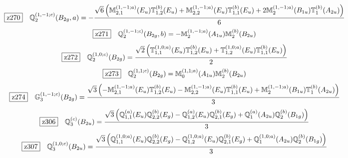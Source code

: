 \documentclass[fleqn,10pt,landscape]{jsarticle}
\begin{document}
\begin{dmath*}
\hspace*{3mm}\fbox{z270}\quad \mathbb{Q}_{2}^{(1,-1;c)}(B_{2g},a)=- \frac{\sqrt{6} \left(\mathbb{M}_{2,1}^{(1,-1;a)}(E_{u}) \mathbb{T}_{1,2}^{(b)}(E_{u}) + \mathbb{M}_{2,2}^{(1,-1;a)}(E_{u}) \mathbb{T}_{1,1}^{(b)}(E_{u}) + 2 \mathbb{M}_{2}^{(1,-1;a)}(B_{1u}) \mathbb{T}_{1}^{(b)}(A_{2u})\right)}{6}
\end{dmath*}
\begin{dmath*}
\hspace*{3mm}\fbox{z271}\quad \mathbb{Q}_{2}^{(1,-1;c)}(B_{2g},b)=- \mathbb{M}_{2}^{(1,-1;a)}(A_{1u}) \mathbb{M}_{2}^{(b)}(B_{2u})
\end{dmath*}
\begin{dmath*}
\hspace*{3mm}\fbox{z272}\quad \mathbb{Q}_{2}^{(1,0;c)}(B_{2g})=\frac{\sqrt{2} \left(\mathbb{T}_{1,1}^{(1,0;a)}(E_{u}) \mathbb{T}_{1,2}^{(b)}(E_{u}) + \mathbb{T}_{1,2}^{(1,0;a)}(E_{u}) \mathbb{T}_{1,1}^{(b)}(E_{u})\right)}{2}
\end{dmath*}
\begin{dmath*}
\hspace*{3mm}\fbox{z273}\quad \mathbb{Q}_{2}^{(1,1;c)}(B_{2g})=\mathbb{M}_{0}^{(1,1;a)}(A_{1u}) \mathbb{M}_{2}^{(b)}(B_{2u})
\end{dmath*}
\begin{dmath*}
\hspace*{3mm}\fbox{z274}\quad \mathbb{G}_{3}^{(1,-1;c)}(B_{2g})=\frac{\sqrt{3} \left(- \mathbb{M}_{2,1}^{(1,-1;a)}(E_{u}) \mathbb{T}_{1,2}^{(b)}(E_{u}) - \mathbb{M}_{2,2}^{(1,-1;a)}(E_{u}) \mathbb{T}_{1,1}^{(b)}(E_{u}) + \mathbb{M}_{2}^{(1,-1;a)}(B_{1u}) \mathbb{T}_{1}^{(b)}(A_{2u})\right)}{3}
\end{dmath*}
\begin{dmath*}
\hspace*{3mm}\fbox{z306}\quad \mathbb{Q}_{3}^{(c)}(B_{2u})=\frac{\sqrt{3} \left(\mathbb{Q}_{1,1}^{(a)}(E_{u}) \mathbb{Q}_{2,2}^{(b)}(E_{g}) - \mathbb{Q}_{1,2}^{(a)}(E_{u}) \mathbb{Q}_{2,1}^{(b)}(E_{g}) + \mathbb{Q}_{1}^{(a)}(A_{2u}) \mathbb{Q}_{2}^{(b)}(B_{1g})\right)}{3}
\end{dmath*}
\begin{dmath*}
\hspace*{3mm}\fbox{z307}\quad \mathbb{Q}_{3}^{(1,0;c)}(B_{2u})=\frac{\sqrt{3} \left(\mathbb{Q}_{1,1}^{(1,0;a)}(E_{u}) \mathbb{Q}_{2,2}^{(b)}(E_{g}) - \mathbb{Q}_{1,2}^{(1,0;a)}(E_{u}) \mathbb{Q}_{2,1}^{(b)}(E_{g}) + \mathbb{Q}_{1}^{(1,0;a)}(A_{2u}) \mathbb{Q}_{2}^{(b)}(B_{1g})\right)}{3}
\end{dmath*}
\end{document}
